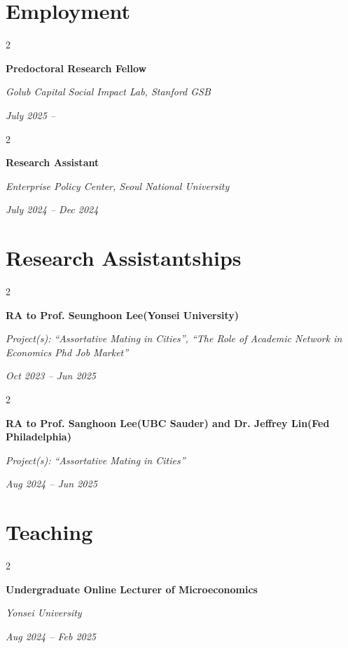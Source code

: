 \documentclass[10pt, letterpaper]{article}
\newenvironment{twocolentry}[2][]{
	\onecolentry
	\def\secondColumn{#2}
	\setcolumnwidth{\fill, 4.5 cm}
	\begin{paracol}{2}
	}{
		\switchcolumn \raggedleft \secondColumn
	\end{paracol}
	\endonecolentry
} %
\begin{document}
	
	\vspace{12pt}

	\section{Employment}
	
			\begin{twocolentry}{
			\textit{July 2025 –}    
			
			\textit{}}
		\textbf{Predoctoral Research Fellow}
		
		\textit{Golub Capital Social Impact Lab, Stanford GSB}
	\end{twocolentry}
	
		\begin{twocolentry}{
			\textit{July 2024 – Dec 2024}    
			
			\textit{}}
		\textbf{Research Assistant}
		
		\textit{Enterprise Policy Center, Seoul National University}
	\end{twocolentry}
	
	
	
	\vspace{12pt}
	
	\section{Research Assistantships}
	
	\begin{twocolentry}{
		\textit{Oct 2023 – Jun 2025}
		}
		\textbf{RA to Prof. Seunghoon Lee(Yonsei University)}
		
		\textit{Project(s): ``Assortative Mating in Cities'', ``The Role of Academic Network in Economics Phd Job Market''}
	\end{twocolentry}

	\begin{twocolentry}{
		\textit{Aug 2024 – Jun 2025}    
		}
		\textbf{RA to Prof. Sanghoon Lee(UBC Sauder) and Dr. Jeffrey Lin(Fed Philadelphia)}
		
		\textit{Project(s): ``Assortative Mating in Cities''}
	\end{twocolentry}
	
\vspace{12pt}

	
	
	
	\section{Teaching}
		\begin{twocolentry}{
			\textit{Aug 2024 – Feb 2025}    
			
			\textit{}}
		\textbf{Undergraduate Online Lecturer of Microeconomics}
		
		\textit{Yonsei University}
	\end{twocolentry}
	
\end{document}
